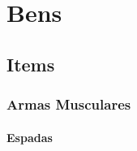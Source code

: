 \part{Bens}
\chapter{Items}
\section{Armas Musculares}
\subsection{Espadas}
\paragraph{}
%
%
%
%
%
%
%
